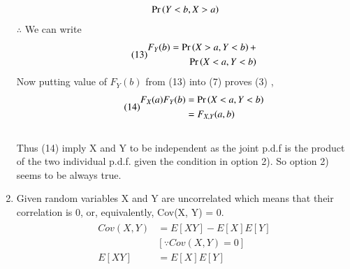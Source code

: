 \documentclass[journal,12pt,twocolumn]{IEEEtran}
\begin{document}
\begin{enumerate}
\begin{align}
\begin{split}
                  &\ \ \ \ \Pr\left(Y < b, X > a\right)
    \end{split}
\end{align}
$\therefore$ We can write
\begin{align}\tag{13}
    \begin{split}
        F_Y(b) = \Pr\left(X > a, Y < b\right) +\\
                 \Pr\left(X < a, Y < b\right)
    \end{split}
\end{align}
Now putting value of $F_Y(b)$ from (13) into (7) proves (3) ,
\begin{align}\tag{14}
    \begin{split}
        F_X(a)F_Y(b) &= \Pr\left(X < a, Y < b\right)\\
                     &= F_{X, Y}(a,b)
    \end{split}
\end{align}\\
Thus (14) imply X and Y to be independent as the joint p.d.f is the product of the two individual p.d.f. given the condition in option 2).
So option 2) seems to be always true.\\

    \item Given random variables X and Y are uncorrelated which means that their correlation is 0, or, equivalently, Cov(X, Y) = 0.\\
\begin{align}\tag{15}
    \begin{split}
        Cov(X, Y) &= E[XY] - E[X]E[Y]\\
        &[\because Cov(X, Y) = 0]\\
        E[XY] &= E[X]E[Y]
    \end{split}
\end{align}


\end{enumerate}
\end{document}
